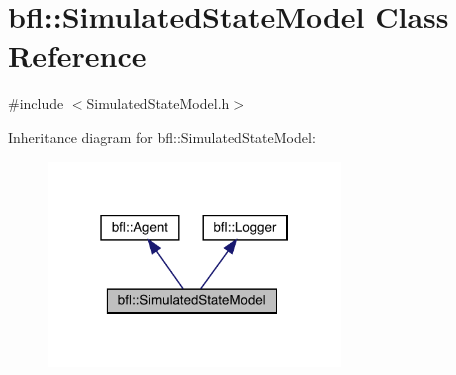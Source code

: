 \hypertarget{classbfl_1_1SimulatedStateModel}{}\section{bfl\+:\+:Simulated\+State\+Model Class Reference}
\label{classbfl_1_1SimulatedStateModel}


{\ttfamily \#include $<$Simulated\+State\+Model.\+h$>$}



Inheritance diagram for bfl\+:\+:Simulated\+State\+Model\+:
\nopagebreak
\begin{figure}[H]
\begin{center}
\leavevmode
\includegraphics[width=220pt]{classbfl_1_1SimulatedStateModel__inherit__graph}
\end{center}
\end{figure}
